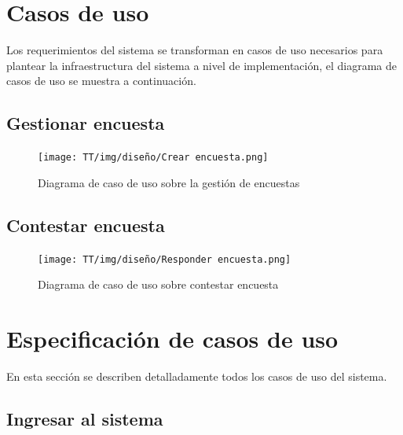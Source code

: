 \section{Casos de uso}
Los requerimientos del sistema se transforman en casos de uso necesarios para plantear la infraestructura del sistema a nivel de implementación, el diagrama de casos de uso se muestra a continuación.

\subsection{Gestionar encuesta}

\begin{figure}[!ht]
    \centering
    \texttt{[image: TT/img/diseño/Crear encuesta.png]}
    \caption{Diagrama de caso de uso sobre la gestión de encuestas }
    \label{graphic:CU-D-gestionar-encuesta}
\end{figure}


\subsection{Contestar encuesta}

\begin{figure}[!ht]
    \centering
    \texttt{[image: TT/img/diseño/Responder encuesta.png]}
    \caption{Diagrama de caso de uso sobre contestar encuesta}
    \label{graphic:CU-D-contestar-encuesta}
\end{figure}


\section{Especificación de casos de uso}

En esta sección se describen detalladamente todos los casos de uso del sistema.

\subsection{Ingresar al sistema}

